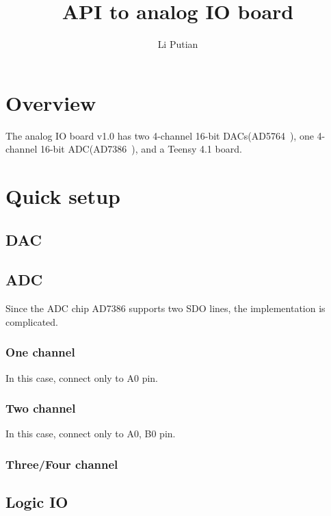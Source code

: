 \documentclass[pre, 12pt]{revtex4}
\begin{document}
\title{API to analog IO board}
\author{Li Putian}
\maketitle
\section{Overview}
The analog IO board v1.0 has two 4-channel 16-bit DACs(AD5764~\parencite{AD5764}), one 4-channel 16-bit ADC(AD7386~\parencite{AD7386}), and a Teensy 4.1 board. 

\section{Quick setup} 
\subsection{DAC}
\subsection{ADC}
Since the ADC chip AD7386 supports two SDO lines, the implementation is complicated. 
\subsubsection{One channel}
In this case, connect only to A0 pin. 
\subsubsection{Two channel}
In this case, connect only to A0, B0 pin. 
\subsubsection{Three/Four channel}
\subsection{Logic IO} 

\nocite{*}


\end{document}

